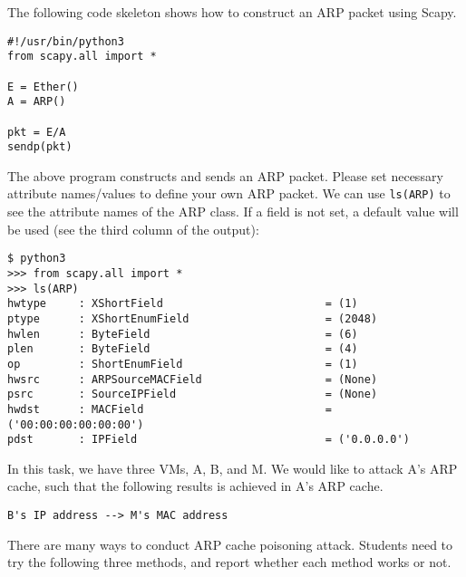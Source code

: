 The following code skeleton shows how to construct an ARP packet using Scapy.

\begin{lstlisting}
#!/usr/bin/python3
from scapy.all import *

E = Ether()
A = ARP()

pkt = E/A
sendp(pkt)
\end{lstlisting}

The above program constructs and sends an ARP packet. Please set necessary attribute
names/values to define your own ARP packet. We can use \texttt{ls(ARP)} to see the attribute
names of the ARP class. If a field is not set, a default value will be used (see the third
column of the output):

\begin{lstlisting}
$ python3
>>> from scapy.all import *
>>> ls(ARP)
hwtype     : XShortField                         = (1)
ptype      : XShortEnumField                     = (2048)
hwlen      : ByteField                           = (6)
plen       : ByteField                           = (4)
op         : ShortEnumField                      = (1)
hwsrc      : ARPSourceMACField                   = (None)
psrc       : SourceIPField                       = (None)
hwdst      : MACField                            = ('00:00:00:00:00:00')
pdst       : IPField                             = ('0.0.0.0')
\end{lstlisting}

In this task, we have three VMs, A, B, and M. We would like to attack A's ARP cache, such that
the following results is achieved in A's ARP cache. 

\begin{lstlisting}
B's IP address --> M's MAC address
\end{lstlisting}

There are many ways to conduct ARP cache poisoning attack. Students need to try the following
three methods, and report whether each method works or not.

